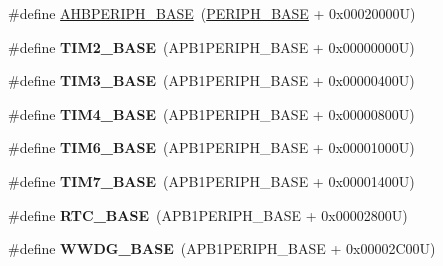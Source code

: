 \begin{DoxyCompactItemize}
\item 
\#define \hyperlink{group___peripheral__memory__map_ga92eb5d49730765d2abd0f5b09548f9f5}{A\-H\-B\-P\-E\-R\-I\-P\-H\-\_\-\-B\-A\-S\-E}~(\hyperlink{group___peripheral__memory__map_ga9171f49478fa86d932f89e78e73b88b0}{P\-E\-R\-I\-P\-H\-\_\-\-B\-A\-S\-E} + 0x00020000\-U)
\item 
\hypertarget{group___peripheral__memory__map_ga00d0fe6ad532ab32f0f81cafca8d3aa5}{\#define {\bfseries T\-I\-M2\-\_\-\-B\-A\-S\-E}~(A\-P\-B1\-P\-E\-R\-I\-P\-H\-\_\-\-B\-A\-S\-E + 0x00000000\-U)}\label{group___peripheral__memory__map_ga00d0fe6ad532ab32f0f81cafca8d3aa5}

\item 
\hypertarget{group___peripheral__memory__map_gaf0c34a518f87e1e505cd2332e989564a}{\#define {\bfseries T\-I\-M3\-\_\-\-B\-A\-S\-E}~(A\-P\-B1\-P\-E\-R\-I\-P\-H\-\_\-\-B\-A\-S\-E + 0x00000400\-U)}\label{group___peripheral__memory__map_gaf0c34a518f87e1e505cd2332e989564a}

\item 
\hypertarget{group___peripheral__memory__map_ga56e2d44b0002f316527b8913866a370d}{\#define {\bfseries T\-I\-M4\-\_\-\-B\-A\-S\-E}~(A\-P\-B1\-P\-E\-R\-I\-P\-H\-\_\-\-B\-A\-S\-E + 0x00000800\-U)}\label{group___peripheral__memory__map_ga56e2d44b0002f316527b8913866a370d}

\item 
\hypertarget{group___peripheral__memory__map_ga8268ec947929f192559f28c6bf7d1eac}{\#define {\bfseries T\-I\-M6\-\_\-\-B\-A\-S\-E}~(A\-P\-B1\-P\-E\-R\-I\-P\-H\-\_\-\-B\-A\-S\-E + 0x00001000\-U)}\label{group___peripheral__memory__map_ga8268ec947929f192559f28c6bf7d1eac}

\item 
\hypertarget{group___peripheral__memory__map_ga0ebf54364c6a2be6eb19ded6b18b6387}{\#define {\bfseries T\-I\-M7\-\_\-\-B\-A\-S\-E}~(A\-P\-B1\-P\-E\-R\-I\-P\-H\-\_\-\-B\-A\-S\-E + 0x00001400\-U)}\label{group___peripheral__memory__map_ga0ebf54364c6a2be6eb19ded6b18b6387}

\item 
\hypertarget{group___peripheral__memory__map_ga4265e665d56225412e57a61d87417022}{\#define {\bfseries R\-T\-C\-\_\-\-B\-A\-S\-E}~(A\-P\-B1\-P\-E\-R\-I\-P\-H\-\_\-\-B\-A\-S\-E + 0x00002800\-U)}\label{group___peripheral__memory__map_ga4265e665d56225412e57a61d87417022}

\item 
\hypertarget{group___peripheral__memory__map_ga9a5bf4728ab93dea5b569f5b972cbe62}{\#define {\bfseries W\-W\-D\-G\-\_\-\-B\-A\-S\-E}~(A\-P\-B1\-P\-E\-R\-I\-P\-H\-\_\-\-B\-A\-S\-E + 0x00002\-C00\-U)}\label{group___peripheral__memory__map_ga9a5bf4728ab93dea5b569f5b972cbe62}


\end{DoxyCompactItemize}
